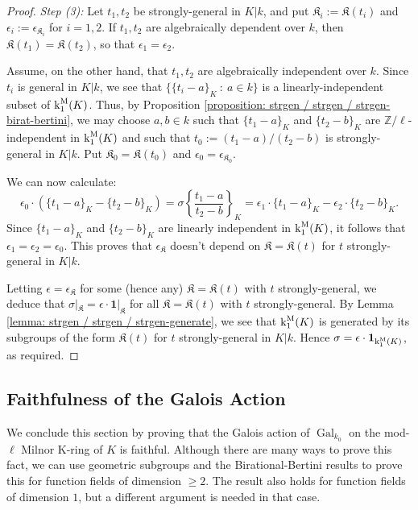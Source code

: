 \documentclass[11pt]{amsart}
\theoremstyle{definition}
\theoremstyle{remark}
\numberwithin{equation}{section}
\DeclareMathOperator{\Gal}{Gal}
\newcommand{\Z}{\mathbb{Z}}
\newcommand{\Kfrak}{\mathfrak{K}}
\renewcommand{\k}{\operatorname{k}^{\rm M}}
\newcommand{\one}{\mathbf{1}}
\newcommand{\Galk}{{\Gal_{k_0}}}
\begin{document}
\begin{proof}
  \vskip 5pt
  \noindent\emph{Step (3):}
  Let $t_1,t_2$ be strongly-general in $K|k$, and put $\Kfrak_i := \Kfrak(t_i)$ and $\epsilon_i := \epsilon_{\Kfrak_i}$ for $i = 1,2$.
  If $t_1,t_2$ are algebraically dependent over $k$, then $\Kfrak(t_1) = \Kfrak(t_2)$, so that $\epsilon_1 = \epsilon_2$.

  Assume, on the other hand, that $t_1,t_2$ are algebraically independent over $k$.
  Since $t_i$ is general in $K|k$, we see that $\{\{t_i-a\}_K \ : \ a \in k\}$ is a linearly-independent subset of $\k_1(K)$.
  Thus, by Proposition \ref{proposition: strgen / strgen / strgen-birat-bertini}, we may choose $a,b \in k$ such that $\{t_1-a\}_K$ and $\{t_2-b\}_K$ are $\Z/\ell$-independent in $\k_1(K)$ and such that $t_0 := (t_1-a)/(t_2-b)$ is strongly-general in $K|k$.
  Put $\Kfrak_0 = \Kfrak(t_0)$ and $\epsilon_0 = \epsilon_{\Kfrak_0}$.

  We can now calculate:
  \[ \epsilon_0 \cdot (\{t_1-a\}_K - \{t_2-b\}_K) = \sigma \left\{\frac{t_1-a}{t_2-b}\right\}_K = \epsilon_1 \cdot \{t_1-a\}_K - \epsilon_2 \cdot \{t_2-b\}_K.\]
  Since $\{t_1-a\}_K$ and $\{t_2-b\}_K$ are linearly independent in $\k_1(K)$, it follows that $\epsilon_1 = \epsilon_2 = \epsilon_0$.
  This proves that $\epsilon_\Kfrak$ doesn't depend on $\Kfrak = \Kfrak(t)$ for $t$ strongly-general in $K|k$.

  Letting $\epsilon = \epsilon_\Kfrak$ for some (hence any) $\Kfrak = \Kfrak(t)$ with $t$ strongly-general, we deduce that $\sigma|_\Kfrak = \epsilon \cdot \one|_\Kfrak$ for all $\Kfrak = \Kfrak(t)$ with $t$ strongly-general.
  By Lemma \ref{lemma: strgen / strgen / strgen-generate}, we see that $\k_1(K)$ is generated by its subgroups of the form $\Kfrak(t)$ for $t$ strongly-general in $K|k$. 
  Hence $\sigma = \epsilon \cdot \one_{\k_1(K)}$, as required.
\end{proof}

\subsection{Faithfulness of the Galois Action}
\label{subsection: strgen / galois-action}

We conclude this section by proving that the Galois action of $\Galk$ on the mod-$\ell$ Milnor K-ring of $K$ is faithful.
Although there are many ways to prove this fact, we can use geometric subgroups and the Birational-Bertini results to prove this for function fields of dimension $\geq 2$.
The result also holds for function fields of dimension $1$, but a different argument is needed in that case.
\end{document}
